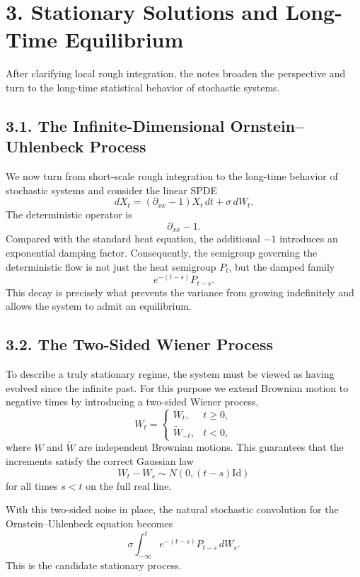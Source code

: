\documentclass[11pt]{article}
\theoremstyle{definition}
\theoremstyle{remark}
\begin{document}
\section*{3. Stationary Solutions and Long-Time Equilibrium}
After clarifying local rough integration, the notes broaden the perspective and turn to the long-time statistical behavior of stochastic systems.

\subsection*{3.1. The Infinite-Dimensional Ornstein--Uhlenbeck Process}
We now turn from short-scale rough integration to the long-time behavior of stochastic systems and consider the linear SPDE
\[
dX_t=(\partial_{xx}-1)X_t\,dt+\sigma\,dW_t.
\]
The deterministic operator is
\[
\partial_{xx}-1.
\]
Compared with the standard heat equation, the additional \(-1\) introduces an exponential damping factor. Consequently, the semigroup governing the deterministic flow is not just the heat semigroup \(P_t\), but the damped family
\[
e^{-(t-s)}P_{t-s}.
\]
This decay is precisely what prevents the variance from growing indefinitely and allows the system to admit an equilibrium.

\subsection*{3.2. The Two-Sided Wiener Process}
To describe a truly stationary regime, the system must be viewed as having evolved since the infinite past. For this purpose we extend Brownian motion to negative times by introducing a two-sided Wiener process,
\[
W_t=
\begin{cases}
W_t, & t\ge 0,\\
\widetilde W_{-t}, & t<0,
\end{cases}
\]
where \(W\) and \(\widetilde W\) are independent Brownian motions. This guarantees that the increments satisfy the correct Gaussian law
\[
W_t-W_s\sim N(0,(t-s)\mathrm{Id})
\]
for all times \(s<t\) on the full real line.

With this two-sided noise in place, the natural stochastic convolution for the Ornstein--Uhlenbeck equation becomes
\[
\sigma\int_{-\infty}^t e^{-(t-s)}P_{t-s}\,dW_s.
\]
This is the candidate stationary process.
\end{document}
